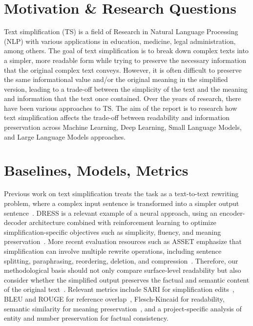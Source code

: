 \documentclass[11pt,a4paper]{article}
\begin{document}
\section*{Motivation \& Research Questions}
Text simplification (TS) is a field of Research in Natural Language Processing (NLP) with various applications in education, medicine, legal administration, among others. The goal of text simplification is to break down complex texts into a simpler, more readable form while trying to preserve the necessary information that the original complex text conveys\cite{Shardlow2014}. However, it is often difficult to preserve the same informational value and/or the original meaning in the simplified version, leading to a trade-off between the simplicity of the text and the meaning and information that the text once contained. Over the years of research, there have been various approaches to TS. The aim  of the report is to research how text simplification affects the trade-off between readability and information preservation across Machine Learning, Deep Learning, Small Language Models, and Large Language Models approaches.

\section{Baselines, Models, Metrics}
Previous work on text simplification treats the task as a text-to-text rewriting problem,
where a complex input sentence is transformed into a simpler output sentence~\cite{XuEtAl2016}. DRESS is a relevant example of a neural approach, using an encoder-decoder architecture combined with reinforcement learning
to optimize simplification-specific objectives such as simplicity, fluency, and meaning preservation~\cite{zhang-lapata-2017-sentence}.
More recent evaluation resources such as ASSET emphasize that simplification can involve multiple rewrite operations,
including sentence splitting, paraphrasing, reordering, deletion, and compression~\cite{AlvaManchegoEtAl2020}.
Therefore, our methodological basis should not only compare surface-level readability but also consider whether the simplified output preserves
the factual and semantic content of the original text~\cite{XuEtAl2016,zhang-lapata-2017-sentence,AlvaManchegoEtAl2020}. Relevant metrics include SARI for simplification edits~\cite{XuEtAl2016},
BLEU and ROUGE for reference overlap~\cite{PapineniEtAl2002,Lin2004},
Flesch-Kincaid for readability,
semantic similarity for meaning preservation~\cite{zhang-lapata-2017-sentence},
and a project-specific analysis of entity and number preservation for factual consistency.
\end{document}
